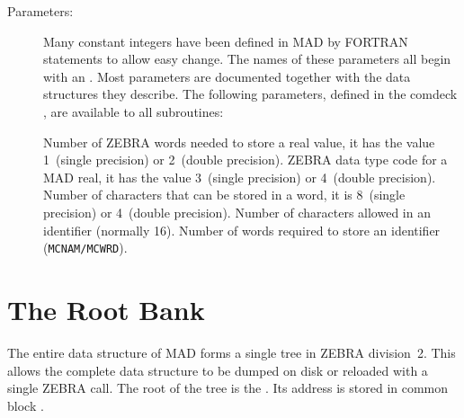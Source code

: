 \begin{description}
\item[Parameters:]
Many constant integers have been defined in MAD by FORTRAN
statements to allow easy change.
The names of these parameters all begin with an .
Most parameters are documented together with the data structures
they describe.
The following parameters, defined in the comdeck ,
are available to all subroutines:
\begin{mylist}
Number of ZEBRA words needed to store a real value,
it has the value 1~(single precision) or 2~(double precision).
ZEBRA data type code for a MAD real,
it has the value 3~(single precision) or 4~(double precision).
Number of characters that can be stored in a word,
it is 8~(single precision) or 4~(double precision).
Number of characters allowed in an identifier (normally 16).
Number of words required to store an identifier
({\tt MCNAM/MCWRD}).
\end{mylist}
\end{description}
\clearpage
 
\section{The Root Bank}
\label{Sroot}
 
The entire data structure of MAD forms a single tree
in ZEBRA division~2.
This allows the complete data structure to be dumped on disk
or reloaded with a single ZEBRA call.
The root of the tree is the .
Its address  is stored in common block
.
 
